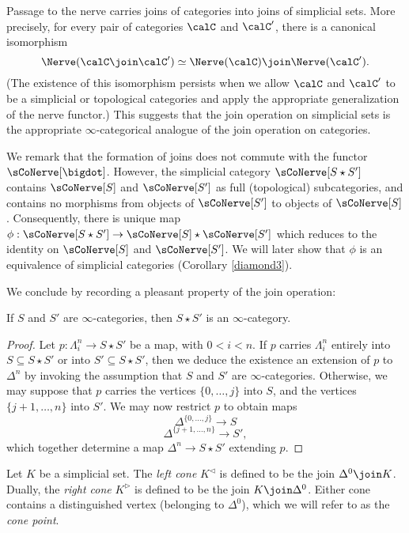 Passage to the nerve carries joins of
categories into joins of simplicial sets. More precisely, for every pair of
categories $\calC$ and $\calC'$, there is
a canonical isomorphism $$\Nerve( \calC \join \calC') \simeq
\Nerve(\calC) \join \Nerve(\calC').$$ (The existence of this
isomorphism persists when we allow $\calC$ and $\calC'$ to be a simplicial or
topological categories and apply the appropriate generalization of
the nerve functor.) This suggests that the join operation on
simplicial sets is the appropriate $\infty$-categorical analogue of
the join operation on categories.

We remark that the formation of joins does not commute with the
functor $\sCoNerve[\bigdot]$. However, the simplicial category $\sCoNerve[S \star S']$
contains $\sCoNerve[S]$ and $\sCoNerve[S']$ as full (topological)
subcategories, and contains no morphisms from objects of
$\sCoNerve[S']$ to objects of $\sCoNerve[S]$. Consequently, there is unique map $\phi: \sCoNerve[S \star S'] \rightarrow \sCoNerve[S] \star \sCoNerve[S']$ which reduces to the identity on
$\sCoNerve[S]$ and $\sCoNerve[S']$. We will later show that $\phi$ is an equivalence of simplicial categories (Corollary \ref{diamond3}).

We conclude by recording a pleasant property of the join
operation:

\begin{proposition}
If $S$ and $S'$ are $\infty$-categories, then $S \star S'$ is an $\infty$-category.
\end{proposition}

\begin{proof}
Let $p: \Lambda^n_i \rightarrow S \star S'$ be a map, with $0 < i
< n$. If $p$ carries $\Lambda^n_i$ entirely into $S \subseteq S
\star S'$ or into $S' \subseteq S \star S'$, then we deduce
the existence an extension of $p$ to $\Delta^n$ by invoking
the assumption that $S$ and $S'$ are $\infty$-categories. Otherwise,
we may suppose that $p$ carries the vertices $\{0, \ldots, j\}$
into $S$, and the vertices $\{ j+1, \ldots, n\}$ into $S'$. 
We may now restrict $p$ to obtain maps
$$ \Delta^{ \{ 0, \ldots, j \} } \rightarrow S$$
$$ \Delta^{ \{ j+1, \ldots, n \} } \rightarrow S',$$
which together determine a map $\Delta^n \rightarrow S \star S'$ extending $p$.
\end{proof}

\begin{notation}
Let $K$ be a simplicial set. The {\it left cone} $K^{\triangleleft}$ is defined to be
the join $\Delta^0 \join K$. Dually, the {\it right cone} $K^{\triangleright}$ is defined to be the join $K \join \Delta^0$. Either cone contains a distinguished vertex (belonging to $\Delta^0$), which we will refer to as the {\it cone point}.
\end{notation}

